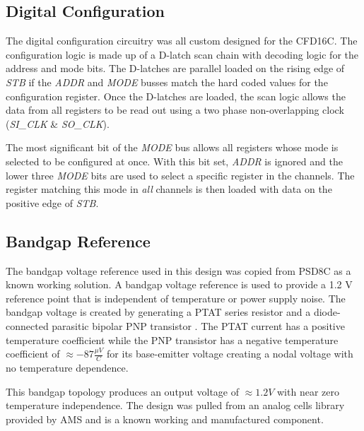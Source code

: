 \documentclass[12pt,oneside,final]{siuethesis}
\theoremstyle{definition}
\begin{document}
\subsection{Digital Configuration}
\par The digital configuration circuitry was all custom designed for the CFD16C. The configuration logic is made up of a D-latch scan chain with decoding logic for the address and mode bits. The D-latches are parallel loaded on the rising edge of \emph{STB} if the \emph{ADDR} and \emph{MODE} busses match the hard coded values for the configuration register. Once the D-latches are loaded, the scan logic allows the data from all registers to be read out using a two phase non-overlapping clock (\emph{SI\_CLK} \& \emph{SO\_CLK}). 
\par The most significant bit of the \emph{MODE} bus allows all registers whose mode is selected to be configured at once. With this bit set, \emph{ADDR} is ignored and the lower three \emph{MODE} bits are used to select a specific register in the channels. The register matching this mode in \emph{all} channels is then loaded with data on the positive edge of \emph{STB}.
\subsection{Bandgap Reference}
\par The bandgap voltage reference used in this design was copied from PSD8C as a known working solution. A bandgap voltage reference is used to provide a 1.2 V reference point that is independent of temperature or power supply noise. The bandgap voltage is created by generating a PTAT series resistor and a diode-connected parasitic bipolar PNP transistor \cite{ALLEN}. The PTAT current has a positive temperature coefficient while the PNP transistor has a negative temperature coefficient of $\approx -87 \frac{\mu V}{C}$ for its base-emitter voltage creating a nodal voltage with no temperature dependence.
\par This bandgap topology produces an output voltage of $\approx 1.2 V$ with near zero temperature independence. The design was pulled from an analog cells library provided by AMS and is a known working and manufactured component.
\end{document}
